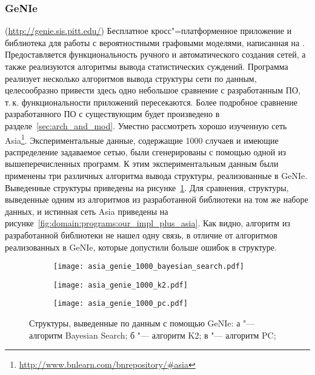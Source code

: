 \subsubsection{GeNIe }
\label{sub:domain:existing_programs:genie}
(\url{http://genie.sis.pitt.edu/})
Бесплатное кросс"=платформенное приложение и библиотека для работы с вероятностными графовыми моделями, написанная на \cpp{}.
Предоставляется функциональность ручного и автоматического создания сетей, а также реализуются алгоритмы вывода статистических суждений.
Программа реализует несколько алгоритмов вывода структуры сети по данным, целесообразно привести здесь одно небольшое сравнение с разработанным ПО, т.\,к. функциональности приложений пересекаются.
Более подробное сравнение разработанного ПО с существующим будет произведено в разделе~\ref{sec:arch_and_mod}.
Уместно рассмотреть хорошо изученную сеть Asia\footnote{\url{http://www.bnlearn.com/bnrepository/\#asia}}.
Экспериментальные данные, содержащие \num{1000} случаев и имеющие распределение задаваемое сетью, были сгенерированы с помощью одной из вышеперечисленных программ.
К этим экспериментальным данным были применены три различных алгоритма вывода структуры, реализованные в GeNIe.
Выведенные структуры приведены на рисунке~\ref{fig:domain:programs:genie_infered_structrures}.
Для сравнения, структуры, выведенные одним из алгоритмов из разработанной библиотеки на том же наборе данных, и истинная сеть Asia приведены на рисунке~\ref{fig:domain:programs:our_impl_plus_asia}.
Как видно, алгоритм из разработанной библиотеки не нашел одну связь, в отличие от алгоритмов реализованных в GeNIe, которые допустили больше ошибок в структуре.

\begin{figure}[ht]
\centering
  \begin{subfigure}[b]{0.51\textwidth}
    \centering
    \texttt{[image: asia\_genie\_1000\_bayesian\_search.pdf]}
    \caption{}
  \end{subfigure}
  \begin{subfigure}[b]{0.48\textwidth}
    \centering
    \texttt{[image: asia\_genie\_1000\_k2.pdf]}
    \caption{}
  \end{subfigure}
  \begin{subfigure}[b]{0.9\textwidth}
    \centering
    \texttt{[image: asia\_genie\_1000\_pc.pdf]}
    \caption{}
  \end{subfigure}
  \caption{ Структуры, выведенные по данным с помощью GeNIe: а "--- алгоритм Bayesian Search;
            б "--- алгоритм K2;
            в "--- алгоритм PC;}
  \label{fig:domain:programs:genie_infered_structrures}
\end{figure}


